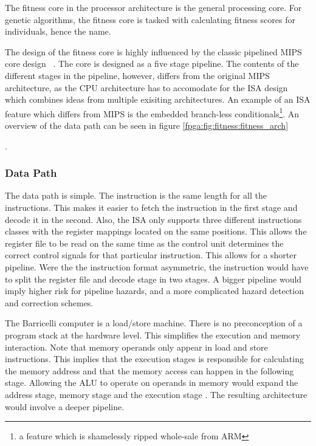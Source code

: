 The fitness core in the processor architecture is the general processing core.
For genetic algorithms, the fitness core is tasked with calculating fitness scores for individuals, hence the name.

The design of the fitness core is highly influenced by the classic pipelined \gls{MIPS} core design ~\cite[p.~362]{compOrgDes}.
The core is designed as a five stage pipeline.
The contents of the different stages in the pipeline, however, differs from the original \gls{MIPS} architecture, as the CPU architecture has to accomodate for the \gls{ISA} design which combines ideas from multiple exisiting architectures.
An example of an \gls{ISA} feature which differs from \gls{MIPS} is the embedded branch-less conditionals\footnote{a feature which is shamelessly ripped whole-sale from ARM}.
An overview of the data path can be seen in figure \vref{fpga:fig:fitness:fitness_arch}

.

\newpage
\subsubsection{Data Path} 

The data path is simple.
The instruction is the same length for all the instructions.
This makes it easier to fetch the instruction in the first stage and decode it in the second.
Also, the ISA only supports three different instructions classes with the register mappings located on the same positions.
This allows the register file to be read on the same time as the control unit determines the correct control signals for that particular instruction.
This allows for a shorter pipeline.
Were the the instruction format asymmetric, the instruction would have to split the register file and decode stage in two stages.
A bigger pipeline would imply higher risk for pipeline hazards, and a more complicated hazard detection and correction schemes. 

The Barricelli computer is a load/store machine.
There is no preconception of a program stack at the hardware level.
This simplifies the execution and memory interaction.
Note that memory operands only appear in load and store instructions.
This implies that the execution stages is responsible for calculating the memory address and that the memory access can happen in the following stage.
Allowing the ALU to operate on operands in memory would expand the address stage, memory stage and the execution stage \cite[p.~335]{compOrgDes}.
The resulting architecture would involve a deeper pipeline. 


